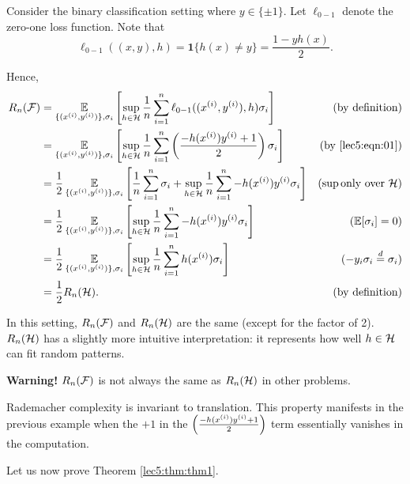 \begin{example}
Consider the binary classification setting where $y \in \{\pm 1\}$. Let $\ell_{0-1}$ denote the zero-one loss function. Note that
\begin{equation}\label{lec5:eqn:01}
    \ell_{0-1}((x,y), h) = \mathbf{1}\{h(x) \neq y\} = \frac{1-yh(x)}{2}.
\end{equation}

Hence,
\begin{align}
    R_n(\mathcal F) &= \operatorname*{\mathbb{E}}_{\{(x^{(i)}, y^{(i)})\}, \sigma_i} \left[ \sup_{h \in \mathcal H} \frac{1}{n}\sum^n_{i=1} \ell_{0-1}((x^{(i)}, y^{(i)}),h)\sigma_i \right] &(\text{by definition}) \\
    &= \operatorname*{\mathbb{E}}_{\{(x^{(i)}, y^{(i)})\}, \sigma_i} \left[ \sup_{h \in \mathcal H} \frac{1}{n}\sum^n_{i=1} \left(\frac{-h(x^{(i)})y^{(i)}+1}{2}\right)\sigma_i \right] &(\text{by } \eqref{lec5:eqn:01}) \\
    &= \frac{1}{2} \operatorname*{\mathbb{E}}_{\{(x^{(i)}, y^{(i)})\}, \sigma_i} \left[ \frac{1}{n}\sum^n_{i=1}\sigma_i + \sup_{h \in \mathcal H} \frac{1}{n}\sum^n_{i=1} -h(x^{(i)})y^{(i)}\sigma_i \right] &(\sup \text{only over } \mathcal H) \\
    &= \frac{1}{2} \operatorname*{\mathbb{E}}_{\{(x^{(i)}, y^{(i)})\}, \sigma_i} \left[\sup_{h \in \mathcal H} \frac{1}{n}\sum^n_{i=1} -h(x^{(i)})y^{(i)}\sigma_i \right] &(\operatorname*{\mathbb{E}} [\sigma_i] = 0) \\
    &=\frac{1}{2} \operatorname*{\mathbb{E}}_{\{(x^{(i)}, y^{(i)})\}, \sigma_i} \left[\sup_{h \in \mathcal H} \frac{1}{n}\sum^n_{i=1} h(x^{(i)})\sigma_i \right] &(-y_i \sigma_i \stackrel{d}{=} \sigma_i) \\
    &= \frac{1}{2}R_n(\mathcal H). &(\text{by definition})
\end{align}

In this setting, $R_n(\mathcal F)$ and $R_n(\mathcal H)$ are the same (except for the factor of 2). $R_n(\mathcal H)$ has a slightly more intuitive interpretation: it represents how well $h \in \mathcal H$ can fit random patterns.

\textbf{Warning!} $R_n(\mathcal F)$ is not always the same as $R_n(\mathcal H)$ in other problems.
\end{example}

\begin{remark}
Rademacher complexity is invariant to translation. This property manifests in the previous example when the $+1$ in the $\left(\frac{-h(x^{(i)})y^{(i)}+1}{2}\right)$ term essentially vanishes in the computation.
\end{remark}

Let us now prove Theorem \ref{lec5:thm:thm1}.

